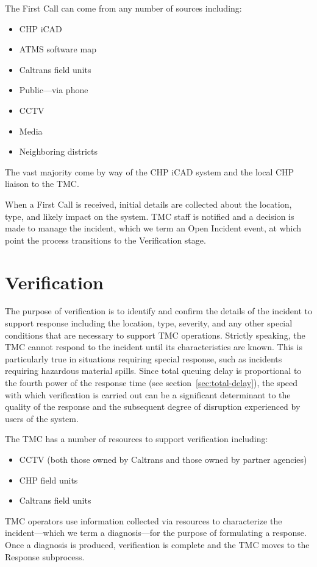 \documentclass[12pt]{report}
\newcounter{time}
\begin{document}
The {\sc First Call} can come from any number of sources including:
\begin{itemize}
\item \ac{CHP} \ac{iCAD}
\item \acf{ATMS} software map
\item Caltrans field units
\item Public---via phone
\item CCTV
\item Media
\item Neighboring districts
\end{itemize}
The vast majority come by way of the \ac{CHP} \ac{iCAD} system and the local
\ac{CHP} liaison to the \ac{TMC}.

When a {\sc First Call} is received, initial details are collected about the
location, type, and likely impact on the system.  \ac{TMC} staff is notified and
a decision is made to manage the incident, which we term an {\sc Open Incident}
event, at which point the process transitions to the Verification stage.


\section{Verification}
\label{sec:verification}

The purpose of verification is to identify and confirm the details of the
incident to support response including the location, type, severity, and any
other special conditions that are necessary to support \ac{TMC} operations.
Strictly speaking, the \ac{TMC} cannot respond to the incident until its
characteristics are known.  This is particularly true in situations requiring
special response, such as incidents requiring hazardous material spills.  Since
total queuing delay is proportional to the fourth power of the response time
(see section~\ref{sec:total-delay}), the speed with which verification is
carried out can be a significant determinant to the quality of the response and
the subsequent degree of disruption experienced by users of the system.

The \ac{TMC} has a number of resources to support verification including:
\begin{itemize}
\item CCTV (both those owned by Caltrans and those owned by partner
  agencies)
\item \ac{CHP} field units
\item Caltrans field units
\end{itemize}
\ac{TMC} operators use information collected via resources to characterize the
incident---which we term a diagnosis---for the purpose of formulating a
response.  Once a diagnosis is produced, verification is complete and the
\ac{TMC} moves to the {\sc Response} subprocess.
\end{document}
